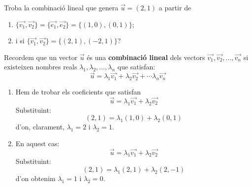 \Exercise Troba la combinació lineal que genera $\vec{u}=(2,1)$ a partir de
\begin{enumerate}
  \item  $\{\overrightarrow{v_1},\overrightarrow{v_2}\} = \{\overrightarrow{e_1},\overrightarrow{e_2}\} = \{ (1,0),(0,1) \}$; 
  \item i si $\{\overrightarrow{v_1},\overrightarrow{v_2}\} = \{ (2,1),(-2,1) \}$?
\end{enumerate}

\Answer Recordem que un vector $\vec{u}$ és una {\bf combinació lineal} dels vectors $\overrightarrow{v_1},\overrightarrow{v_2}, \ldots , \overrightarrow{v_n}$ si existeixen nombres reals $\lambda_1, \lambda_2, \ldots, \lambda_n$ que satisfan:
\[\vec{u} = \lambda_1 \overrightarrow{v_1} + \lambda_2 \overrightarrow{v_2} + \cdots \lambda_n \overrightarrow{v_n}\]

\begin{enumerate}
  \item Hem de trobar els coeficients que satisfan 
  \[\vec{u} = \lambda_1 \overrightarrow{v_1} + \lambda_2 \overrightarrow{v_2} \]
  Substituint:
  \[(2,1)=\lambda_1 (1,0) + \lambda_2 (0,1)\]
  d'on, clarament, $\lambda_1=2$ i $\lambda_2=1$.
  \item En aquest cas:
  \[\vec{u} = \lambda_1 \overrightarrow{v_1} + \lambda_2 \overrightarrow{v_2} \]
  Substituint:
  \[(2,1)=\lambda_1 (2,1) + \lambda_2 (2,-1)\]
  d'on obtenim $\lambda_1=1$ i $\lambda_2=0$.
\end{enumerate}
\blacksquare

